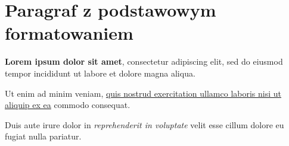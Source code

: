 \documentclass{article}
\begin{document}
\section{Paragraf z podstawowym formatowaniem}
\begin{flushleft}
\textbf{Lorem ipsum dolor sit amet}, consectetur adipiscing elit, sed do eiusmod tempor incididunt ut labore et dolore magna aliqua.
\end{flushleft}
\begin{center}
Ut enim ad minim veniam, \underline{quis nostrud exercitation ullamco laboris nisi ut aliquip ex ea} commodo consequat.    
\end{center}
\begin{flushright}
Duis aute irure dolor in \emph{reprehenderit in voluptate} velit esse cillum dolore eu fugiat nulla pariatur.
\end{flushright}
\end{document}
